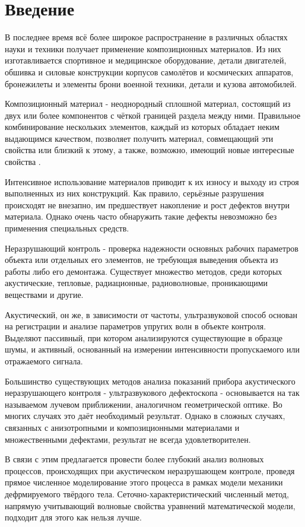\section*{Введение}
В последнее время всё более широкое распространение в различных областях науки и техники получает применение композиционных материалов. 
Из них изготавливается спортивное и медицинское оборудование, детали двигателей, обшивка и силовые конструкции корпусов самолётов и космических аппаратов, 
бронежилеты и элементы брони военной техники, детали и кузова автомобилей.

Композиционный материал - неоднородный сплошной материал, состоящий из двух или более компонентов с чёткой границей раздела между ними.
Правильное комбинирование нескольких элементов, каждый из которых обладает неким выдающимся качеством, позволяет получить материал, 
совмещающий эти свойства или близкий к этому, а также, возможно, имеющий новые интересные свойства \cite{resler}.

Интенсивное использование материалов приводит к их износу и выходу из строя выполненных из них конструкций. Как правило, серьёзные разрушения происходят не
внезапно, им предшествует накопление и рост дефектов внутри материала. Однако очень часто обнаружить такие дефекты невозможно без применения специальных
средств. 

Неразрушающий контроль - проверка надежности основных рабочих параметров объекта или отдельных его элементов, не требующая выведения объекта из работы либо его демонтажа.
Существует множество методов, среди которых акустические, тепловые, радиационные, радиоволновые, проникающими веществами и другие.

Акустический, он же, в зависимости от частоты, ультразвуковой способ основан на регистрации и анализе параметров упругих волн в объекте контроля. Выделяют пассивный, при котором анализируются существующие в образце шумы, и активный, основанный на измерении интенсивности пропускаемого или отражаемого сигнала.

Большинство существующих методов анализа показаний прибора акустического неразрушающего контроля - ультразвукового дефектоскопа - основывается на так называемом лучевом приближении, аналогичном геометрической оптике. Во многих случаях это даёт необходимый результат. Однако в сложных случаях, связанных с анизотропными и композиционными  материалами и  множественными дефектами, результат не всегда удовлетворителен.

В связи с этим предлагается провести более глубокий анализ волновых процессов, происходящих при акустическом неразрушающем контроле, проведя прямое численное моделирование этого процесса в рамках модели механики дефрмируемого твёрдого тела. Сеточно\hyp{}характеристический численный метод, напрямую учитывающий волновые свойства уравнений математической модели, подходит для этого как нельзя лучше.

